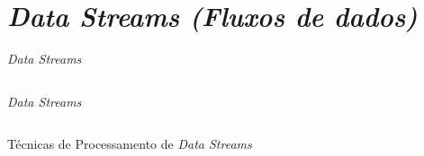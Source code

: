 \section{\itshape Data Streams  \textnormal{(Fluxos de  dados)}}

\begin{frame}{\textit{Data Streams}}
    \begin{columns}
	    \centering

	    \centering
      
	\end{columns}
\end{frame}

\begin{frame}{\textit{Data Streams}}
	\begin{columns}
	    \centering
	       
	        
	    \centering
	      
	\end{columns}
\end{frame}


\begin{frame}{Técnicas de Processamento de \textit{Data Streams}}
	
\end{frame}